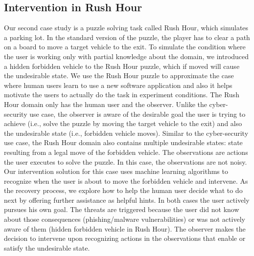 \subsection{Intervention in Rush Hour}
Our second case study is a puzzle solving task called Rush Hour, which simulates a parking lot. In the standard version of the puzzle, the player has to clear a path on a board to move a target vehicle to the exit. To simulate the condition where the user is working only with partial knowledge about the domain, we introduced a hidden forbidden vehicle to the Rush Hour puzzle, which if moved will cause the undesirable state. 
We use the Rush Hour puzzle to approximate the case where human users learn to use a new software application and also it helps motivate the users to actually do the task in experiment conditions. 
The Rush Hour domain only has the human user and the observer. 
Unlike the cyber-security use case, the observer is aware of the desirable goal the user is trying to achieve (i.e., solve the puzzle by moving the target vehicle to the exit) and also the undesirable state (i.e., forbidden vehicle moves).
Similar to the cyber-security use case, the Rush Hour domain also contains multiple undesirable states: state resulting from a legal move of the forbidden vehicle. 
The observations are actions the user executes to solve the puzzle. In this case, the observations are not noisy.
Our intervention solution for this case uses machine learning algorithms to recognize when the user is about to move the forbidden vehicle and intervene.
As the recovery process, we explore how to help the human user decide what to do next by offering further assistance as helpful hints.
In both cases the user actively pursues his own goal. 
The threats are triggered because the user did not know about those consequences (phishing/malware vulnerabilities) or was not actively aware of them (hidden forbidden vehicle in Rush Hour). 
The observer makes the decision to intervene upon recognizing actions in the observations that enable or satisfy the undesirable state.
 
